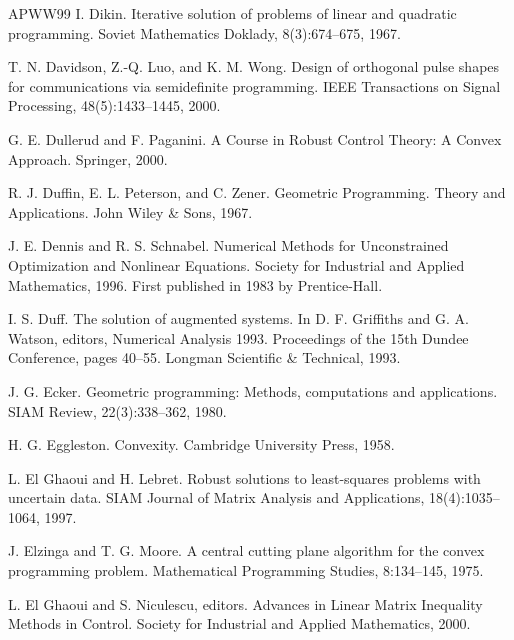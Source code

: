 \begin{thebibliography}{APWW99}
 I. Dikin. Iterative solution of problems of linear and quadratic programming. Soviet Mathematics Doklady, 8(3):674–675, 1967.

 T. N. Davidson, Z.-Q. Luo, and K. M. Wong. Design of orthogonal pulse shapes for communications via semidefinite programming. IEEE Transactions on Signal Processing, 48(5):1433–1445, 2000.

 G. E. Dullerud and F. Paganini. A Course in Robust Control Theory: A Convex Approach. Springer, 2000.

 R. J. Duffin, E. L. Peterson, and C. Zener. Geometric Programming. Theory and Applications. John Wiley \& Sons, 1967.

 J. E. Dennis and R. S. Schnabel. Numerical Methods for Unconstrained Optimization and Nonlinear Equations. Society for Industrial and Applied Mathematics, 1996. First published in 1983 by Prentice-Hall.

 I. S. Duff. The solution of augmented systems. In D. F. Griffiths and G. A. Watson, editors, Numerical Analysis 1993. Proceedings of the 15th Dundee Conference, pages 40–55. Longman Scientific \& Technical, 1993.

 J. G. Ecker. Geometric programming: Methods, computations and applications. SIAM Review, 22(3):338–362, 1980.

 H. G. Eggleston. Convexity. Cambridge University Press, 1958.

 L. El Ghaoui and H. Lebret. Robust solutions to least-squares problems with uncertain data. SIAM Journal of Matrix Analysis and Applications, 18(4):1035–1064, 1997.

 J. Elzinga and T. G. Moore. A central cutting plane algorithm for the convex programming problem. Mathematical Programming Studies, 8:134–145, 1975.

 L. El Ghaoui and S. Niculescu, editors. Advances in Linear Matrix Inequality Methods in Control. Society for Industrial and Applied Mathematics, 2000.


\end{thebibliography}
